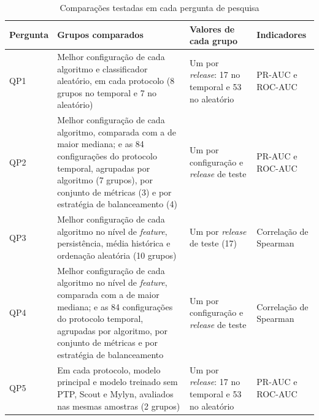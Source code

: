 \begin{table}[htbp]
    
    \centering
    \footnotesize
    \caption{Comparações testadas em cada pergunta de pesquisa}
    \label{tab:met-hipoteses}
    \begin{tabular}{p{1.4cm}p{6.0cm}p{3.5cm}p{2.4cm}}
        \toprule
        Pergunta & Grupos comparados & Valores de cada grupo & Indicadores \\
        \midrule
        QP1 & Melhor configuração de cada algoritmo e classificador aleatório, em cada protocolo (8 grupos no temporal
              e 7 no aleatório) &
              Um por \textit{release}: 17 no temporal e 53 no aleatório & PR-AUC e ROC-AUC \\
        \midrule
        QP2 & Melhor configuração de cada algoritmo, comparada com a de maior mediana; e as 84 configurações
              do protocolo temporal, agrupadas por algoritmo (7 grupos), por conjunto de métricas (3) e por estratégia
              de balanceamento (4) &
              Um por configuração e \textit{release} de teste & PR-AUC e ROC-AUC \\
        \midrule
        QP3 & Melhor configuração de cada algoritmo no nível de \textit{feature}, persistência, média histórica e
              ordenação aleatória (10 grupos) &
              Um por \textit{release} de teste (17) & Correlação de Spearman \\
        \midrule
        QP4 & Melhor configuração de cada algoritmo no nível de \textit{feature}, comparada com a de maior mediana; e as
              84 configurações do protocolo temporal, agrupadas por algoritmo, por conjunto de métricas e por
              estratégia de balanceamento &
              Um por configuração e \textit{release} de teste & Correlação de Spearman \\
        \midrule
        QP5 & Em cada protocolo, modelo principal e modelo treinado sem PTP, Scout e
              Mylyn, avaliados nas mesmas amostras (2 grupos) &
              Um por \textit{release}: 17 no temporal e 53 no aleatório & PR-AUC e ROC-AUC \\
        \bottomrule
    \end{tabular}
\end{table}%
